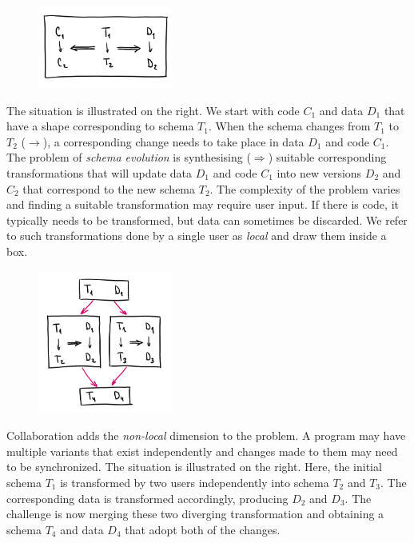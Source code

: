 \documentclass[english,submission]{programming}
\begin{document}
\begin{figure}
\vspace{-1.5em}
\includegraphics[width=12em]{figures/arr-basic.png}
\vspace{-1.5em}
\end{figure}

The situation is illustrated on the right. We start with code $C_1$ and
data $D_1$ that have a shape corresponding to schema $T_1$. When the schema changes from $T_1$ to $T_2$ ($\rightarrow$),
a corresponding change needs to take place in data $D_1$ and code $C_1$. The problem
of \emph{schema evolution} is synthesising ($\Rightarrow$) suitable corresponding transformations
that will update data $D_1$ and code $C_1$ into new versions $D_2$ and $C_2$ that correspond
to the new schema $T_2$.
%
The complexity of the problem varies and finding a suitable transformation may require user
input. If there is code, it typically needs to be transformed, but data can sometimes be
discarded. We refer to such transformations done by a single user as \emph{local} and draw
them inside a box.

\begin{figure}
\vspace{-1.5em}
\includegraphics[width=12em]{figures/arr-forkjoin.png}
\vspace{-1.5em}
\end{figure}

Collaboration adds the \emph{non-local} dimension to the problem. A program may have multiple
variants that exist independently and changes made to them may need to be synchronized. The
situation is illustrated on the right. Here, the initial schema $T_1$ is transformed by two
users independently into schema $T_2$ and $T_3$. The corresponding data is transformed accordingly,
producing $D_2$ and $D_3$. The challenge is now merging these two diverging transformation and
obtaining a schema $T_4$ and data $D_4$ that adopt both of the changes.
\end{document}
